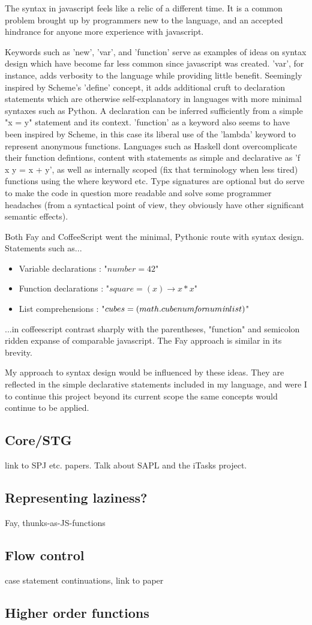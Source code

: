 \documentclass[11pt]{article}
\begin{document}
The syntax in javascript feels like a relic of a different time. It is a common
problem brought up by programmers new to the language, and an accepted
hindrance for anyone more experience with javascript. 

Keywords such as 'new', 'var', and 'function' serve as examples of ideas on syntax
design which have become far less common since javascript was created. 'var', for
instance, adds verbosity to the language while providing little benefit. Seemingly
inspired by Scheme's 'define' concept, it adds additional cruft to declaration 
statements which are otherwise self-explanatory in languages with more minimal 
syntaxes such as Python. A declaration can be inferred sufficiently from a simple
"x = y" statement and its context. 'function' as a keyword also seems to have been
inspired by Scheme, in this case its liberal use of the 'lambda' keyword to represent
anonymous functions. Languages such as Haskell dont overcomplicate their function
defintions, content with statements as simple and declarative as 'f x y = x + y',
as well as internally scoped (fix that terminology when less tired) functions using
the where keyword etc.
Type signatures are optional but do serve to make the code in question more readable and
solve some programmer headaches (from a syntactical point of view, they obviously have other 
significant semantic effects). 

Both Fay and CoffeeScript went the minimal, Pythonic route with syntax design. Statements
such as...
\begin{itemize}
\item Variable declarations : "\(number = 42\)"
\item Function declarations : "\(square = (x) \rightarrow x * x\)"
\item List comprehensions : "\(cubes = (math.cube num \emph{for} num \emph{in} list)\)"
\end{itemize}

...in coffeescript contrast sharply with the parentheses, "function" and semicolon 
ridden expanse of comparable javascript. The Fay approach is similar in its brevity.

My approach to syntax design would be influenced by these ideas. They are reflected 
in the simple declarative statements included in my language, and were I to continue
this project beyond its current scope the same concepts would continue to be applied.


\subsection{Core/STG}
link to SPJ etc. papers. Talk about SAPL and the iTasks project.

\subsection{Representing laziness?}
Fay, thunks-as-JS-functions

\subsection{Flow control}
case statement continuations, link to paper

\subsection{Higher order functions}
\end{document}
